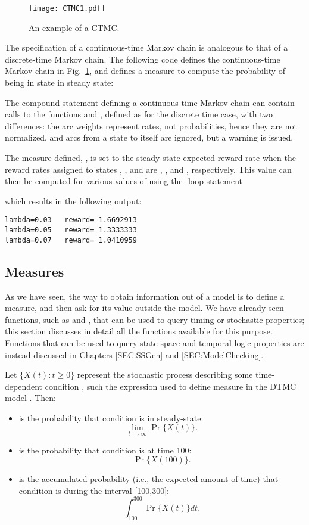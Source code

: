 \begin{figure}
  \centering
  \texttt{[image: CTMC1.pdf]}
  \caption{An example of a CTMC.}
  \label{FIG:CTMC1}
\end{figure}


The specification of a continuous-time Markov chain is analogous to that
of a discrete-time Markov chain.
The following code defines the continuous-time Markov chain
in Fig.~\ref{FIG:CTMC1}, and defines a measure to compute the probability
of being in state  in steady state:
%

%
The compound statement defining a continuous time Markov chain can
contain calls to the functions  and ,
defined as for the discrete time case, with two differences:
the arc weights represent rates, not probabilities,
hence they are not normalized, and
arcs from a state to itself are ignored, but a warning is issued.

The measure defined, , is set to the steady-state expected reward rate
when the reward rates assigned to states , , and 
are , , and , respectively.
This value can then be computed for various
values of  using the -loop statement
%

%
which results in the following output:
\begin{lstlisting}
lambda=0.03   reward= 1.6692913
lambda=0.05   reward= 1.3333333
lambda=0.07   reward= 1.0410959
\end{lstlisting}


\subsection{Measures}

As we have seen, the way to obtain information out of a
model is to define a measure, and then ask for its value outside the model.
We have already seen functions, such as  and ,
that can be used to query timing or stochastic properties;
this section discusses in detail all the functions available for this purpose.
Functions that can be used to query state-space and temporal logic properties
are instead discussed in Chapters \ref{SEC:SSGen} and \ref{SEC:ModelChecking}.

Let $\{X(t):t\geq 0\}$ represent the stochastic process describing
some time-dependent  condition ,
such the expression 
used to define measure  in the DTMC model .
Then:
\begin{itemize}
\item
{} is
the probability that condition  is  in steady-state:
$$\lim_{t\ \rightarrow \infty} \Pr\{X(t)\}.$$
\item
{} is
the probability that condition  is  at time 100:
$$\Pr\{X(100)\}.$$
\item
{} is
the accumulated probability (i.e., the expected amount of time) that condition
 is  during the interval [100,300]:
$$\int_{100}^{300} \Pr\{X(t)\} dt.$$
\end{itemize}

